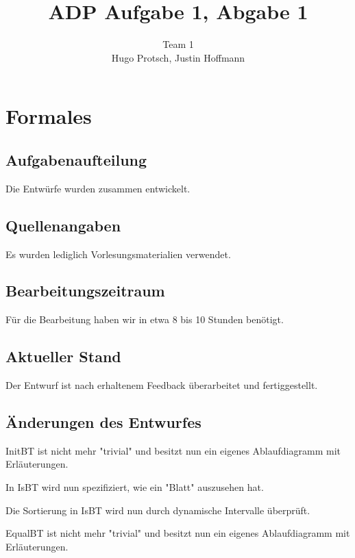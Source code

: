 \documentclass[11pt]{article}
\title{ADP Aufgabe 1, Abgabe 1}
\author{Team 1\\Hugo Protsch, Justin Hoffmann}
\begin{document}
    \maketitle


    \section{Formales}\label{sec:Formales}


    \subsection{Aufgabenaufteilung}
    Die Entwürfe wurden zusammen entwickelt.

    \subsection{Quellenangaben}
    
    Es wurden lediglich Vorlesungsmaterialien verwendet.


    \subsection{Bearbeitungszeitraum}
    Für die Bearbeitung haben wir in etwa 8 bis 10 Stunden benötigt.

    \subsection{Aktueller Stand}
    Der Entwurf ist nach erhaltenem Feedback überarbeitet und fertiggestellt.


    \subsection{Änderungen des Entwurfes}
    InitBT ist nicht mehr "trivial" und besitzt nun ein eigenes Ablaufdiagramm mit Erläuterungen.
    
    In IsBT wird nun spezifiziert, wie ein "Blatt" auszusehen hat.
    
    Die Sortierung in IsBT wird nun durch dynamische Intervalle überprüft.
    
    EqualBT ist nicht mehr "trivial" und besitzt  nun ein eigenes Ablaufdiagramm mit Erläuterungen.
    
\end{document}
